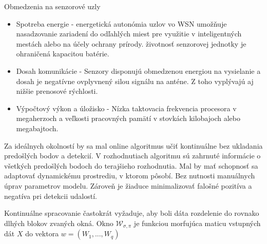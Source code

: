 Obmedzenia na senzorové uzly
\begin{itemize}
\item Spotreba energie - energetická autonómia uzlov vo WSN umožňuje nasadzovanie zariadení do odľahlých miest pre využitie v inteligentných mestách alebo na účely ochrany prírody. životnosť senzorovej jednotky je ohraničená kapacitou batérie.
\item Dosah komunikácie - Senzory disponujú obmedzenou energiou na vysielanie a dosah je negatívne ovplyvnený silou signálu na anténe. Z toho vyplývajú aj nižšie prenosové rýchlosti.
\item Výpočtový výkon a úložisko - Nízka taktovacia frekvencia procesora v megaherzoch a veľkosti pracovných pamätí v stovkách kilobajoch alebo megabajtoch.
\end{itemize}
\cite{big-data-collection-wsn}


Za ideálnych okolností by sa mal online algoritmus učiť kontinuálne bez ukladania predošlých bodov a detekcií.
V rozhodnutiach algoritmu sú zahrnuté informácie o všetkých predošlých bodoch do terajšieho rozhodnutia. Mal by mať schopnosť sa adaptovať dynamickému prostrediu, v ktorom pôsobí. Bez nutnosti manuálnych úprav parametrov modelu. Zároveň je žiaduce minimalizovať falošné pozitíva a negatíva pri detekcii udalostí.

Kontinuálne spracovanie častokrát vyžaduje, aby boli dáta rozdelenie do rovnako dlhých blokov zvaných okná. Okno $\mathcal{W}_{\sigma, \pi}$ je funkciou morfujúca maticu vstupných dát $X$ do vektora $w = (W_1, ... , W_q)$  \cite{online-anomaly-detection}


\emptypage
